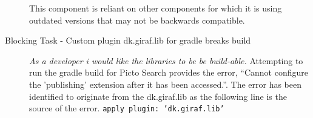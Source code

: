 \begin{description}
        This component is reliant on other components for which it is using outdated versions that may not be backwards compatible.
    \item[Blocking Task - Custom plugin dk.giraf.lib for gradle breaks build]
        \textit{As a developer i would like the libraries to be be build-able.}
        Attempting to run the gradle build for Picto Search provides the error, ``Cannot configure the 'publishing' extension after it has been accessed.''. The error has been identified to originate from the dk.giraf.lib as the following line is the source of the error.
        \texttt{apply plugin: 'dk.giraf.lib'}
\end{description}